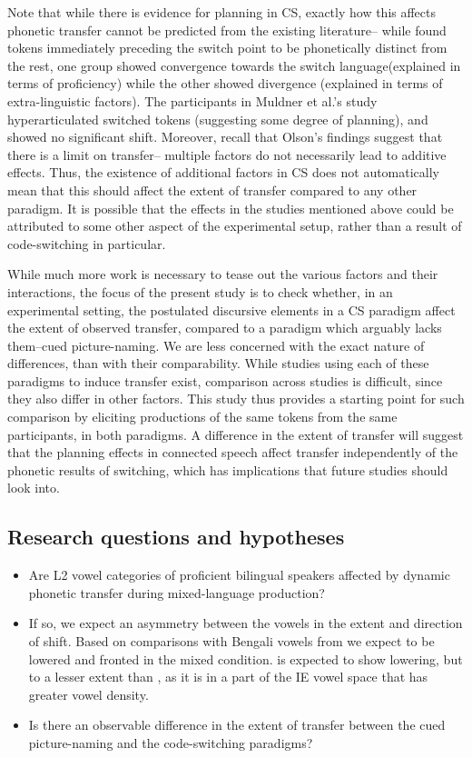 \documentclass[charis,linguex]{glossa}
\newcommand{\nt}[1]{\textipa{[#1]}} %
\begin{document}
Note that while there is evidence for planning in CS, exactly how this affects phonetic transfer cannot be predicted from the existing literature-- while \citep{bullock2009trying} found tokens immediately preceding the switch point to be phonetically distinct from the rest, one group showed convergence towards the switch language(explained in terms of proficiency) while the other showed divergence (explained in terms of extra-linguistic factors). The participants in Muldner et al.'s \citeyear{muldner2019phonetics} study hyperarticulated switched tokens (suggesting some degree of planning), and showed no significant shift. Moreover, recall that Olson's \citeyear{olson2016role} findings suggest that there is a limit on transfer-- multiple factors do not necessarily lead to additive effects. Thus, the existence of additional factors in CS does not automatically mean that this should affect the extent of transfer compared to any other paradigm. It is possible that the effects in the studies mentioned above could be attributed to some other aspect of the experimental setup, rather than a result of code-switching in particular.

While much more work is necessary to tease out the various factors and their interactions, the focus of the present study is to check whether, in an experimental setting, the postulated discursive elements in a CS paradigm affect the extent of observed transfer, compared to a paradigm which arguably lacks them--cued picture-naming. We are less concerned with the exact nature of differences, than with their comparability. While studies using each of these paradigms to induce transfer exist, comparison across studies is difficult, since they also differ in other factors. This study thus provides a starting point for such comparison by eliciting productions of the same tokens from the same participants, in both paradigms. A difference in the extent of transfer will suggest that the planning effects in connected speech affect transfer independently of the phonetic results of switching, which has implications that future studies should look into. 


\subsection{Research questions and hypotheses}
\begin{itemize}
	\item Are L2 vowel categories of proficient bilingual speakers affected by dynamic phonetic transfer during mixed-language production?
	\item If so, we expect an asymmetry between the vowels in the extent and direction of shift. Based on comparisons with Bengali vowels from \cite{dutta2016using} we expect \nt{2} to be lowered and fronted in the mixed condition. \nt{\ae} is expected to show lowering, but to a lesser extent than \nt{2}, as it is in a part of the IE vowel space that has greater vowel density.
	\item Is there an observable difference in the extent of transfer between the cued picture-naming and the code-switching paradigms? 
\end{itemize}
\end{document}
